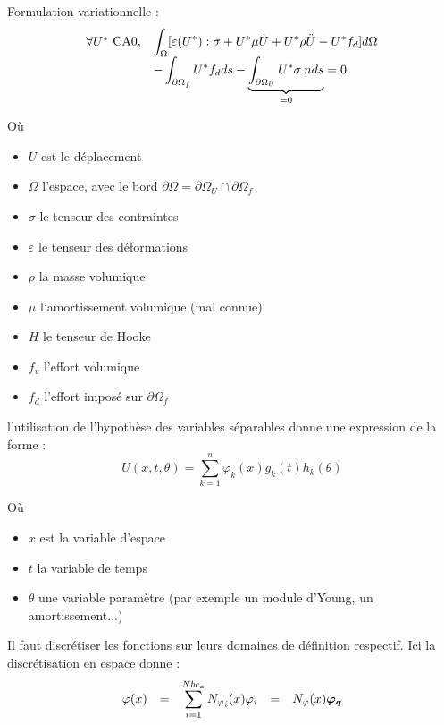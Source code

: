 \documentclass[12pt,a4paper]{report}
\begin{document}
\noindent
Formulation variationnelle : 
\begin{equation}
\begin{array}{l l}
	\forall U^* ~ \text{CA0,} & \displaystyle
		\int_\Omega [\varepsilon (U^*) : \sigma   
					+ U^* \mu \dot{U} 
					+ U^* \rho \ddot{U}
					- U^* f_d
					] d \Omega	
	\\& \displaystyle
		- \int_{\partial \Omega_f} U^* f_d  ds		
		- \underbrace{
			\int_{\partial \Omega_U} U^* \sigma . n ds	
		  }_{=0}
		= 0
\end{array}
\end{equation}

\noindent
Où
\begin{itemize}
\item $U$ est le déplacement
\item $\Omega$ l'espace, avec le bord $\partial \Omega = \partial \Omega_U \cap \partial \Omega_f$
\item $\sigma$ le tenseur des contraintes
\item $\varepsilon$ le tenseur des déformations
\item $\rho$ la masse volumique
\item $\mu$ l'amortissement volumique (mal connue)
\item $H$ le tenseur de Hooke
\item $f_v$ l'effort volumique
\item $f_d$ l'effort imposé sur $\partial \Omega_f$
\end{itemize}
\vspace{0.3cm}

\noindent
l'utilisation de l'hypothèse des variables séparables donne une expression de la forme :
\begin{equation}
	U(x,t,\theta) = \sum_{k=1}^n \varphi_k(x) g_k(t)h_k(\theta)
\end{equation}

\noindent
Où
\begin{itemize}
\item $x$ est la variable d'espace
\item $t$ la variable de temps
\item $\theta$ une variable paramètre (par exemple un module d'Young, un amortissement...)
\end{itemize}
\vspace{0.3cm}

Il faut discrétiser les fonctions sur leurs domaines de définition respectif. Ici la discrétisation en espace donne : 
\begin{equation}
	\begin{array}{l c l c l}
		\varphi(x) &=& \displaystyle \sum_{i=1}^{Nbc_x}  {N_\varphi}_i (x) \varphi_i &=& N_\varphi(x) \boldsymbol{\varphi_q} \\
	\end{array}
\end{equation}
\end{document}

